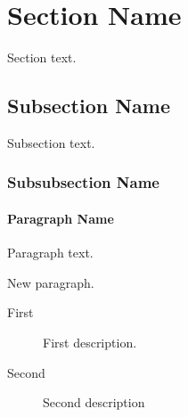 \documentclass[draft]{agujournal2025}
\begin{document}
\begin{abstract}
    Abstract text body with some more content.
     \begin{plainlanguagesummary}
            Plain language summary text body with some more content.
     \end{plainlanguagesummary}
\end{abstract}


\section{Section Name}  %

Section text.


\subsection{Subsection Name}

Subsection text.


\subsubsection{Subsubsection Name}


\paragraph{Paragraph Name}
Paragraph text.
%

New paragraph.
%
\begin{description}
    \item[First] First description.
    \item[Second] Second description
\end{description}
\end{document}
